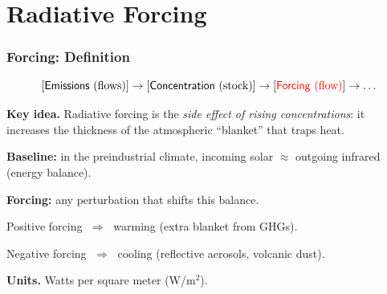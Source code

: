 \documentclass[xcolor=x11names,compress,aspectratio=169]{beamer}%
\makeatletter
\renewenvironment{itemize}{\begin{compactitemize}[<+-| alert@+>]}{\end{compactitemize}}
\makeatother
\begin{document}
\section{Radiative Forcing}%

\begin{frame}%
%

\frametitle{Forcing: Definition}%
\[
\lbrack\text{\textsf{Emissions} (flows)}]\rightarrow\lbrack
\text{\textsf{Concentration} (stock)}]\rightarrow\lbrack\text{%
\color{red}%
\textsf{Forcing} (flow)%
\color{black}%
}]\rightarrow\ldots
\]


\textbf{Key idea.} Radiative forcing is the \emph{side effect of rising
concentrations}: it increases the thickness of the atmospheric ``blanket''
that traps heat. \medskip

\begin{itemize}
\item \textbf{Baseline:} in the preindustrial climate, incoming solar
$\approx$ outgoing infrared (energy balance).

\item \textbf{Forcing:} any perturbation that shifts this balance.

\begin{itemize}
\item Positive forcing $\;\Rightarrow\;$ warming (extra blanket from GHGs).

\item Negative forcing $\;\Rightarrow\;$ cooling (reflective aerosols,
volcanic dust).
\end{itemize}

\item \textbf{Units.} Watts per square meter (W/m$^{2}$).
\end{itemize}

%

\transboxout
\end{frame}%
%
\end{document}
